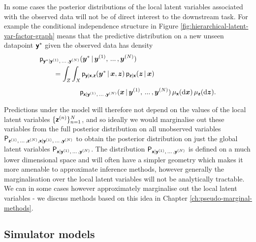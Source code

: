 In some cases the posterior distributions of the local latent variables associated with the observed data will not be of direct interest to the downstream task. For example the conditional independence structure in Figure \ref{fig:hierarchical-latent-var-factor-graph} means that the predictive distribution on a new unseen datapoint $\boldsymbol{\mathsf{y}}^*$ given the observed data has density
\begin{equation}\label{eq:hier-lv-predictive-distribution}
\begin{split}
  &\pden{\rvct{y}^*|\rvct{y}^{(1)},\,...\,,\rvct{y}^{(N)}}(\vct{y}^* \gvn \vct{y}^{(1)},\,...\,,\vct{y}^{(N)}) \\
  &\qquad = 
  \int_{\set{Z}} \int_{\set{X}}
    \pden{\rvct{y}|\rvct{x},\rvct{z}}(\vct{y}^*\gvn\vct{x},\vct{z})\,
    \pden{\rvct{z}|\rvct{x}}(\vct{z}\gvn\vct{x})\\
  &\qquad \phantom{= \int_{\set{Z}} \int_{\set{X}}\,}
    \pden{\rvct{x}|\rvct{y}^{(1)},\,...\,,\rvct{y}^{(N)}}(\vct{x} \gvn \vct{y}^{(1)},\,...\,,\vct{y}^{(N)})
  \,\mu_{\rvct{x}}(\dr \vct{x})\,\mu_{\rvct{z}}(\dr \vct{z}).
\end{split}
\end{equation}
Predictions under the model will therefore not depend on the values of the local latent variables $\lbrace \boldsymbol{\mathsf{z}}^{(n)} \rbrace_{n=1}^N$, and so ideally we would marginalise out these variables from the full posterior distribution on all unobserved variables $\mathsf{P}_{\boldsymbol{\mathsf{z}}^{(1)},\,...\,,\boldsymbol{\mathsf{z}}^{(N)},\boldsymbol{\mathsf{x}}|\boldsymbol{\mathsf{y}}^{(1)},\,...\,,\boldsymbol{\mathsf{y}}^{(N)}}$ to obtain the posterior distribution on just the global latent variables $\mathsf{P}_{\boldsymbol{\mathsf{x}}|\boldsymbol{\mathsf{y}}^{(1)},\,...\,,\boldsymbol{\mathsf{y}}^{(N)}}$. The distribution $\mathsf{P}_{\boldsymbol{\mathsf{x}}|\boldsymbol{\mathsf{y}}^{(1)},\,...\,,\boldsymbol{\mathsf{y}}^{(N)}}$ is defined on a much lower dimensional space and will often have a simpler geometry which makes it more amenable to approximate inference methods, however generally the marginalisation over the local latent variables will not be analytically tractable. We can in some cases however approximately marginalise out the local latent variables - we discuss methods based on this idea in Chapter \ref{ch:pseudo-marginal-methods}.

\subsection{Simulator models}\label{subsec:implicit-models}

